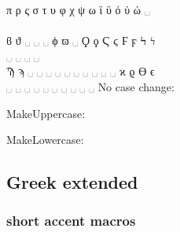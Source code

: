\documentclass[a4paper]{article}
\begin{document}
{  π  ρ  ς  σ  τ  υ  φ  χ  ψ  ω  ϊ  ϋ  ό  ύ  ώ  ␣  \\
  \textpi{} \textrho{} \textfinalsigma{} \textsigma{} \texttau{}
  \textupsilon{} \textphi{} \textchi{} \textpsi{} \textomega{}
  \accdialytika\textiota{} \accdialytika\textupsilon{}
  \acctonos\textomicron{} \acctonos\textupsilon{} \acctonos\textomega{} \\

  ϐ  ϑ  ␣  ␣  ␣  ϕ  ϖ  ␣  Ϙ  ϙ  Ϛ  ϛ  Ϝ  ϝ  Ϟ  ϟ  \\
  \textbetasymbol{} \textthetasymbol{} ␣  ␣  ␣ \textphisymbol{}
  \textpisymbol{} ␣ \textQoppa{} \textqoppa{} \textStigma{} \textstigma{}
  \textDigamma{} \textdigamma{} \textKoppa{} \textkoppa{} \\

  Ϡ  ϡ  ␣  ␣  ␣  ␣  ␣  ␣  ␣  ␣  ␣  ␣  ϰ  ϱ ϴ ϵ \\
  \textSampi{} \textsampi{} ␣  ␣  ␣  ␣  ␣  ␣  ␣  ␣  ␣  ␣
  \textkappasymbol{} \textrhosymbol{} \textThetasymbol{} \textepsilonsymbol
}
No case change:
\begin{quote}
  \GreekAndCoptic
\end{quote}
%
MakeUppercase:
\begin{quote}
  \MakeUppercase{\GreekAndCoptic}
\end{quote}
%
MakeLowercase:
\begin{quote}
  \MakeLowercase{\GreekAndCoptic}
\end{quote}


\subsection{Greek extended}

\subsubsection{short accent macros}
\end{document}
